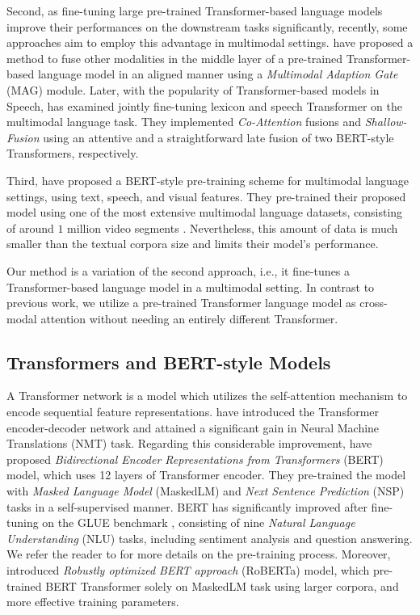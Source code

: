 \documentclass[letterpaper]{article} \usepackage{spconf,amsmath,graphicx}
\begin{document}
Second, as fine-tuning large pre-trained Transformer-based language models improve their performances on the downstream tasks significantly, recently, some approaches aim to employ this advantage in multimodal settings. \cite{rahman2020integrating} have proposed a method to fuse other modalities in the middle layer of a pre-trained Transformer-based language model in an aligned manner using a \textit{Multimodal Adaption Gate} (MAG) module. Later, with the popularity of Transformer-based models in Speech, \cite{siriwardhana2020jointly} has examined jointly fine-tuning lexicon and speech Transformer on the multimodal language task. They implemented \textit{Co-Attention} fusions and \textit{Shallow-Fusion} using an attentive and a straightforward late fusion of two BERT-style \cite{devlin2018bert} Transformers, respectively. 

Third, \cite{khare2021self} have proposed a BERT-style pre-training scheme for multimodal language settings, using text, speech, and visual features. They pre-trained their proposed model using one of the most extensive multimodal language datasets, consisting of around $1$ million video segments \cite{chung2018voxceleb2}. Nevertheless, this amount of data is much smaller than the textual corpora size and limits their model's performance.

Our method is a variation of the second approach, i.e., it fine-tunes a Transformer-based language model in a multimodal setting. In contrast to previous work, we utilize a pre-trained Transformer language model as cross-modal attention without needing an entirely different Transformer.

\subsection{Transformers and BERT-style Models}

A Transformer network is a model which utilizes the self-attention mechanism to encode sequential feature representations.
\cite{vaswani2017attention} have introduced the Transformer encoder-decoder network and attained a significant gain in Neural Machine Translations (NMT) task. Regarding this considerable improvement, \cite{devlin2018bert} have proposed \textit{Bidirectional Encoder Representations from Transformers} (BERT) model, which uses 12 layers of Transformer encoder. They pre-trained the model with \textit{Masked Language Model} (MaskedLM)  and \textit{Next Sentence Prediction} (NSP) tasks in a self-supervised manner. BERT has significantly improved after fine-tuning on the GLUE benchmark \cite{wang2018glue}, consisting of nine \textit{Natural Language Understanding} (NLU) tasks, including sentiment analysis and question answering. We refer the reader to \cite{devlin2018bert} for more details on the pre-training process. Moreover, \cite{liu2019roberta} introduced \textit{Robustly optimized BERT approach} (RoBERTa) model, which pre-trained BERT Transformer solely on MaskedLM task using larger corpora, and more effective training parameters. 
\end{document}
